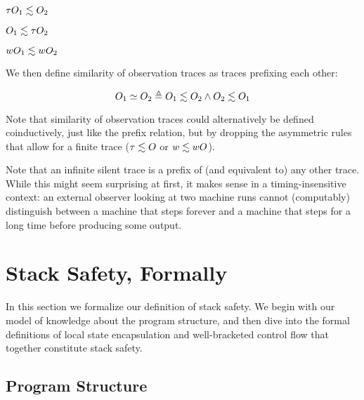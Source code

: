 \documentclass[acmsmall,review,anonymous]{acmart}\settopmatter{printfolios=true,printccs=false,printacmref=false}
\begin{document}
\begin{minipage}{.3\textwidth}
         {\(\tau O_1 \lesssim O_2\)}
\end{minipage}
\begin{minipage}{.3\textwidth}
         {\(O_1 \lesssim \tau O_2\)}
\end{minipage}
\begin{minipage}{.3\textwidth}
         {\(wO_1 \lesssim wO_2\)}
\end{minipage}

We then define similarity of observation traces as traces prefixing each other:

\[O_1 \simeq O_2 \triangleq O_1 \lesssim O_2 \land O_2 \lesssim O_1\]

 Note that
similarity of observation traces could alternatively be defined coinductively,
just like the prefix relation, but by dropping the asymmetric rules that allow
for a finite trace ($\tau \lesssim O$ or $w \lesssim wO$).

Note that an infinite silent trace is a
prefix of (and equivalent to) any other trace. While this might seem
surprising at first, it makes sense in a timing-insensitive context:
an external observer looking at two machine runs cannot (computably)
distinguish between a machine that steps forever and a machine that
steps for a long time before producing some output.

\section{Stack Safety, Formally}
\label{sec:lse-and-wbcf}

In this section we formalize our definition of stack safety. We
begin with our model of  knowledge about the
program structure, and then dive into the formal definitions of local state
encapsulation and well-bracketed control flow that together constitute
stack safety.

\subsection{Program Structure}
\end{document}
